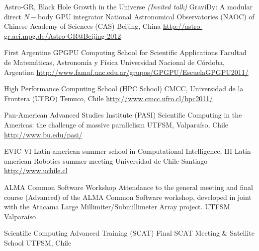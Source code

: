 \documentclass[12pt,a4paper]{moderncv}
\newcommand{\gray}{\textcolor{gray}}
\newcommand{\myurl}[1]{\gray{\url{#1}}}
\begin{document}
        {Astro-GR, Black Hole Growth in the Universe \emph{(Invited talk)}}
        {GraviDy: A modular direct $N-$body GPU integrator}
        {National Astronomical Observatories (NAOC) of Chinese Academy of Sciences
        (CAS)}
        {Beijing, China}
        {\myurl{http://astro-gr.aei.mpg.de/Astro-GR@Beijing-2012}}

        {First Argentine GPGPU Computing School for Scientific Applications}
        {Facultad de Matemáticas, Astronomía y Física}
        {Universidad Nacional de Córdoba, Argentina}
        {\myurl{http://www.famaf.unc.edu.ar/grupos/GPGPU/EscuelaGPGPU2011/}}
        {}

        {High Performance Computing School}
        {(HPC School)}
        {CMCC, Universidad de la Frontera (UFRO)}
        {Temuco, Chile}
        {\myurl{http://www.cmcc.ufro.cl/hpc2011/}}

        {Pan-American Advanced Studies Institute}
        {(PASI)}
        {Scientific Computing in the Americas: the challenge of massive parallelism}
        {UTFSM, Valparaíso, Chile}
        {\myurl{http://www.bu.edu/pasi/}}

        {EVIC}
        {VI Latin-american summer school in Computational Intelligence, %
         III Latin-american Robotics summer meeting}
        {Universidad de Chile}
        {Santiago}
        {\myurl{http://www.uchile.cl}}

        {ALMA Common Software Workshop}
        {Attendance to the general meeting and final course (Advanced) of the ALMA
        Common Software workshop, developed in joint with the Atacama Large
        Millimiter/Submillimeter Array project.}
        {UTFSM}
        {Valparaíso}
        {}

        {Scientific Computing Advanced Training}
        {(SCAT)}
        {Final SCAT Meeting \& Satellite School}
        {UTFSM, Chile}
        {}

\renewcommand*{\listitemsymbol}{\hspace{2em}\labelitemi~}
\end{document}
